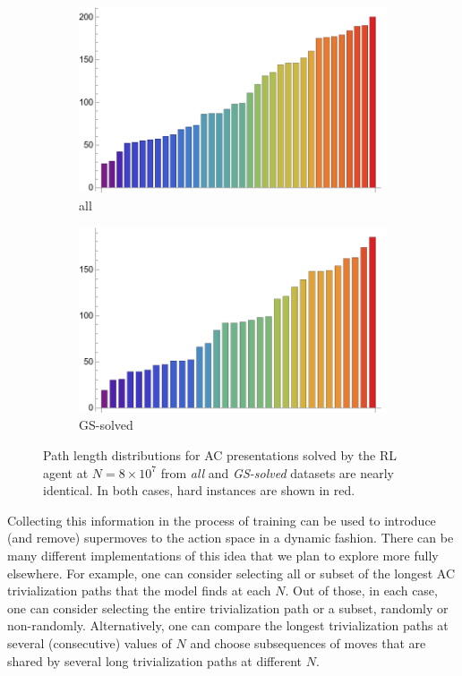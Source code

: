 \begin{figure}[h]
	\centering
	\begin{subfigure}{0.45\textwidth}
		\centering
		\includegraphics[width=\textwidth]{fig/all_path_length_80M.png}
		\caption{all}
		\label{fig:all_path_length_80M}
	\end{subfigure}
	\hfill
	\begin{subfigure}{0.45\textwidth}
		\centering
		\includegraphics[width=\textwidth]{fig/solved_path_length_80M.png}
		\caption{GS-solved}
		\label{fig:solved_path_length_80M}
	\end{subfigure}
	\caption{Path length distributions for AC presentations solved by the RL agent at $N=8 \times 10^7$ from \textit{all} and \textit{GS-solved} datasets are nearly identical. In both cases, hard instances are shown in red.}
	\label{fig:path_length_80M}
\end{figure}

Collecting this information in the process of training can be used to introduce (and remove) supermoves to the action space in a dynamic fashion. There can be many different implementations of this idea that we plan to explore more fully elsewhere. For example, one can consider selecting all or subset of the longest AC trivialization paths that the model finds at each $N$. Out of those, in each case, one can consider selecting the entire trivialization path or a subset, randomly or non-randomly. Alternatively, one can compare the longest trivialization paths at several (consecutive) values of $N$ and choose subsequences of moves that are shared by several long trivialization paths at different $N$.


